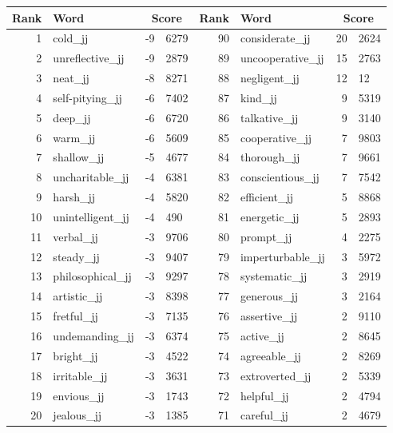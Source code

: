\begin{table}[tbp]
    \begin{tabular}{| rlr@{.}l | rlr@{.}l |}
    \hline
    \textbf{Rank} & \textbf{Word} & \multicolumn{2}{c|}{\textbf{Score}} & \textbf{Rank} & \textbf{Word} & \multicolumn{2}{c|}{\textbf{Score}} \\
    \hline
    1 & cold\_jj & -9 & 6279    &    90 & considerate\_jj & 20 & 2624 \\
    2 & unreflective\_jj & -9 & 2879    &    89 & uncooperative\_jj & 15 & 2763 \\
    3 & neat\_jj & -8 & 8271    &    88 & negligent\_jj & 12 & 12 \\
    4 & self-pitying\_jj & -6 & 7402    &    87 & kind\_jj & 9 & 5319 \\
    5 & deep\_jj & -6 & 6720    &    86 & talkative\_jj & 9 & 3140 \\
    6 & warm\_jj & -6 & 5609    &    85 & cooperative\_jj & 7 & 9803 \\
    7 & shallow\_jj & -5 & 4677    &    84 & thorough\_jj & 7 & 9661 \\
    8 & uncharitable\_jj & -4 & 6381    &    83 & conscientious\_jj & 7 & 7542 \\
    9 & harsh\_jj & -4 & 5820    &    82 & efficient\_jj & 5 & 8868 \\
    10 & unintelligent\_jj & -4 & 490    &    81 & energetic\_jj & 5 & 2893 \\
    11 & verbal\_jj & -3 & 9706    &    80 & prompt\_jj & 4 & 2275 \\
    12 & steady\_jj & -3 & 9407    &    79 & imperturbable\_jj & 3 & 5972 \\
    13 & philosophical\_jj & -3 & 9297    &    78 & systematic\_jj & 3 & 2919 \\
    14 & artistic\_jj & -3 & 8398    &    77 & generous\_jj & 3 & 2164 \\
    15 & fretful\_jj & -3 & 7135    &    76 & assertive\_jj & 2 & 9110 \\
    16 & undemanding\_jj & -3 & 6374    &    75 & active\_jj & 2 & 8645 \\
    17 & bright\_jj & -3 & 4522    &    74 & agreeable\_jj & 2 & 8269 \\
    18 & irritable\_jj & -3 & 3631    &    73 & extroverted\_jj & 2 & 5339 \\
    19 & envious\_jj & -3 & 1743    &    72 & helpful\_jj & 2 & 4794 \\
    20 & jealous\_jj & -3 & 1385    &    71 & careful\_jj & 2 & 4679 \\

\end{tabular}
\end{table}
